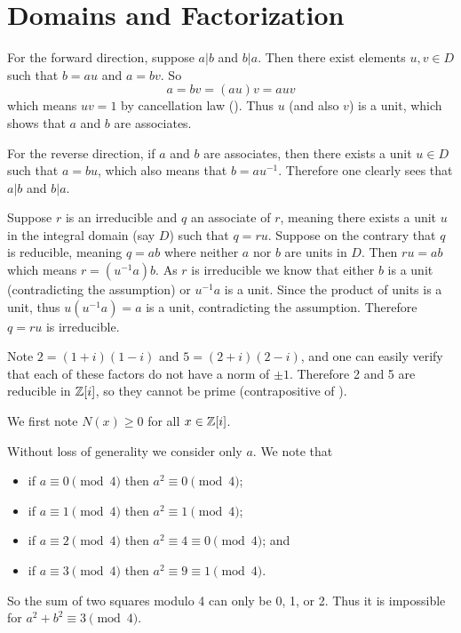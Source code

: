 \section{Domains and Factorization}
\begin{questions}
    \item For the forward direction, suppose $a \vert b$ and $b \vert a$. Then there exist elements $u, v \in D$ such that $b = au$ and $a = bv$. So
    \[
        a = bv = (au)v = auv
    \]
    which means $uv = 1$ by cancellation law (). Thus $u$ (and also $v$) is a unit, which shows that $a$ and $b$ are associates.
    
    For the reverse direction, if $a$ and $b$ are associates, then there exists a unit $u \in D$ such that $a = bu$, which also means that $b = au^{-1}$. Therefore one clearly sees that $a \vert b$ and $b \vert a$.

    \item Suppose $r$ is an irreducible and $q$ an associate of $r$, meaning there exists a unit $u$ in the integral domain (say $D$) such that $q = ru$. Suppose on the contrary that $q$ is reducible, meaning $q = ab$ where neither $a$ nor $b$ are units in $D$. Then $ru = ab$ which means $r = (u^{-1}a)b$. As $r$ is irreducible we know that either $b$ is a unit (contradicting the assumption) or $u^{-1}a$ is a unit. Since the product of units is a unit, thus $u(u^{-1}a) = a$ is a unit, contradicting the assumption. Therefore $q = ru$ is irreducible.
    
    \item \begin{partquestions}{\alph*}
        \item Note $2 = (1+i)(1-i)$ and $5 = (2+i)(2-i)$, and one can easily verify that each of these factors do not have a norm of $\pm1$. Therefore 2 and 5 are reducible in $\mathbb{Z}[i]$, so they cannot be prime (contrapositive of ).
        
        \item We first note $N(x) \geq 0$ for all $x \in \mathbb{Z}[i]$.
        \begin{partquestions}{\roman*}
            \item Without loss of generality we consider only $a$. We note that
            \begin{itemize}
                \item if $a \equiv 0 \pmod4$ then $a^2 \equiv 0 \pmod4$;
                \item if $a \equiv 1 \pmod4$ then $a^2 \equiv 1 \pmod4$;
                \item if $a \equiv 2 \pmod4$ then $a^2 \equiv 4 \equiv 0 \pmod4$; and
                \item if $a \equiv 3 \pmod4$ then $a^2 \equiv 9 \equiv 1 \pmod4$.
            \end{itemize}
            So the sum of two squares modulo 4 can only be 0, 1, or 2. Thus it is impossible for $a^2+b^2 \equiv 3\pmod4$.


\end{partquestions}
\end{partquestions}
\end{questions}
